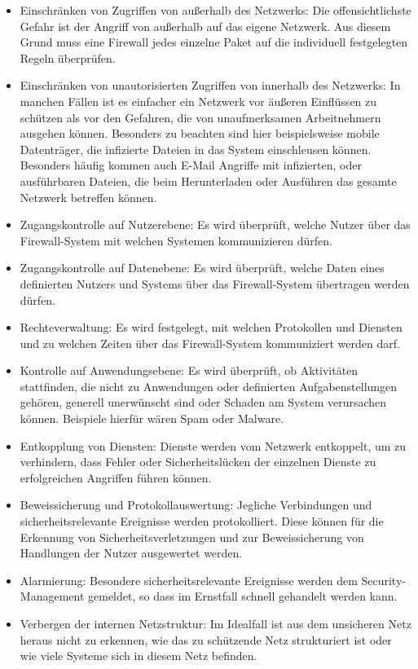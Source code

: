 \begin{itemize}
	\item Einschränken von Zugriffen von außerhalb des Netzwerks: Die offensichtlichste Gefahr ist der Angriff von außerhalb auf das eigene Netzwerk. Aus diesem Grund muss eine Firewall jedes einzelne Paket auf die individuell festgelegten Regeln überprüfen.
	\item Einschränken von unautorisierten Zugriffen von innerhalb des Netzwerks: In manchen Fällen ist es einfacher ein Netzwerk vor äußeren Einflüssen zu schützen als vor den Gefahren, die von unaufmerksamen Arbeitnehmern ausgehen können. Besonders zu beachten sind hier beispielsweise mobile Datenträger, die infizierte Dateien in das System einschleusen können. Besonders häufig kommen auch E-Mail Angriffe mit infizierten, oder ausführbaren Dateien, die beim Herunterladen oder Ausführen das gesamte Netzwerk betreffen können.
	\item Zugangskontrolle auf Nutzerebene: Es wird überprüft, welche Nutzer über das Firewall-System mit welchen Systemen kommunizieren dürfen.
	\item Zugangskontrolle auf Datenebene: Es wird überprüft, welche Daten eines definierten Nutzers und Systems über das Firewall-System übertragen werden dürfen.
	\item Rechteverwaltung: Es wird festgelegt, mit welchen Protokollen und Diensten und zu welchen Zeiten über das Firewall-System kommuniziert werden darf.
	\item Kontrolle auf Anwendungsebene: Es wird überprüft, ob Aktivitäten stattfinden, die nicht zu Anwendungen oder definierten Aufgabenstellungen gehören, generell unerwünscht sind oder Schaden am System verursachen können. Beispiele hierfür wären Spam oder Malware.
	\item Entkopplung von Diensten: Dienste werden vom Netzwerk entkoppelt, um zu verhindern, dass Fehler oder Sicherheitslücken der einzelnen Dienste zu erfolgreichen Angriffen führen können.
	\item Beweissicherung und Protokollauswertung: Jegliche Verbindungen und sicherheitsrelevante Ereignisse werden protokolliert. Diese können für die Erkennung von Sicherheitsverletzungen und zur Beweissicherung von Handlungen der Nutzer ausgewertet werden.
	\item Alarmierung: Besondere sicherheitsrelevante Ereignisse werden dem Security-Management gemeldet, so dass im Ernstfall schnell gehandelt werden kann.
	\item Verbergen der internen Netzstruktur: Im Idealfall ist aus dem unsicheren Netz heraus nicht zu erkennen, wie das zu schützende Netz strukturiert ist oder wie viele Systeme sich in diesem Netz befinden. \footnotemark
\end{itemize}

